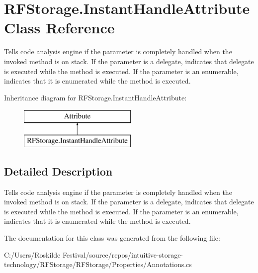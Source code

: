\hypertarget{class_r_f_storage_1_1_instant_handle_attribute}{}\section{R\+F\+Storage.\+Instant\+Handle\+Attribute Class Reference}
\label{class_r_f_storage_1_1_instant_handle_attribute}


Tells code analysis engine if the parameter is completely handled when the invoked method is on stack. If the parameter is a delegate, indicates that delegate is executed while the method is executed. If the parameter is an enumerable, indicates that it is enumerated while the method is executed.  


Inheritance diagram for R\+F\+Storage.\+Instant\+Handle\+Attribute\+:\begin{figure}[H]
\begin{center}
\leavevmode
\includegraphics[height=2.000000cm]{class_r_f_storage_1_1_instant_handle_attribute}
\end{center}
\end{figure}


\subsection{Detailed Description}
Tells code analysis engine if the parameter is completely handled when the invoked method is on stack. If the parameter is a delegate, indicates that delegate is executed while the method is executed. If the parameter is an enumerable, indicates that it is enumerated while the method is executed. 



The documentation for this class was generated from the following file\+:\begin{DoxyCompactItemize}
\item 
C\+:/\+Users/\+Roskilde Festival/source/repos/intuitive-\/storage-\/technology/\+R\+F\+Storage/\+R\+F\+Storage/\+Properties/Annotations.\+cs\end{DoxyCompactItemize}

